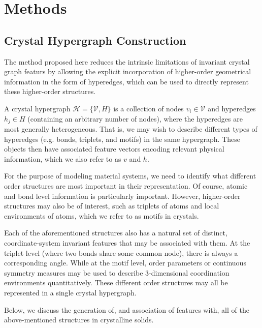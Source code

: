\documentclass[twoside,twocolumn,9pt]{article}
\begin{document}
\section{Methods}

\subsection{Crystal Hypergraph Construction}
The method proposed here reduces the intrinsic limitations of invariant crystal graph featurs by allowing the explicit incorporation of higher-order geometrical information in the form of hyperedges, which can be used to directly represent these higher-order structures.


A crystal hypergraph $\mathcal{H}=\lbrace\mathcal{V}, \mathit{H} \rbrace$ is a collection of nodes $v_i\in \mathcal{V}$ and hyperedges $h_j\in \mathit{H}$ (containing an arbitrary number of nodes), where the hyperedges are most generally heterogeneous. That is, we may wish to describe different types of hyperedges (e.g. bonds, triplets, and motifs) in the same hypergraph. These objects then have associated feature vectors encoding relevant physical information, which we also refer to as $v$ and $h$.

For the purpose of modeling material systems, we need to identify what different order structures are most important in their representation. Of course, atomic and bond level information is particularly important. However, higher-order structures may also be of interest, such as triplets of atoms and local environments of atoms, which we refer to as motifs in crystals.

Each of the aforementioned structures also has a natural set of distinct, coordinate-system invariant features that may be associated with them. At the triplet level (where two bonds share some common node), there is always a corresponding angle. While at the motif level, order parameters \cite{orderparam1, orderparam2} or continuous symmetry measures \cite{csm_polyhedra, chemenv} may be used to describe 3-dimensional coordination environments quantitatively. 
These different order structures may all be represented in a single crystal hypergraph. 



Below, we discuss the generation of, and association of features with, all of the above-mentioned structures in crystalline solids. 
\end{document}
